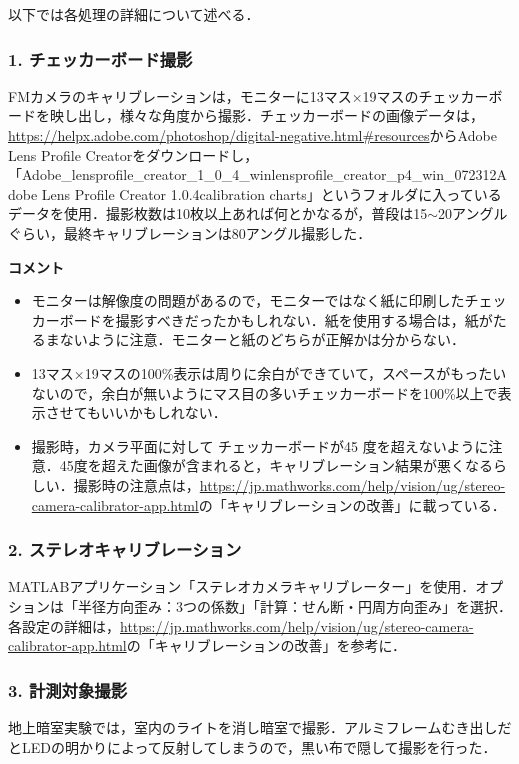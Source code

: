\newpage
以下では各処理の詳細について述べる．

\subsubsection*{1. チェッカーボード撮影}
FMカメラのキャリブレーションは，モニターに13マス×19マスのチェッカーボードを映し出し，様々な角度から撮影．チェッカーボードの画像データは，\url{https://helpx.adobe.com/photoshop/digital-negative.html#resources}からAdobe Lens Profile Creatorをダウンロードし，「\yen Adobe\_lensprofile\_creator\_1\_0\_4\_win\yen  lensprofile\_creator\_p4\_win\_072312\yen Adobe Lens Profile Creator 1.0.4\yen calibration charts」というフォルダに入っているデータを使用．撮影枚数は10枚以上あれば何とかなるが，普段は15$\sim$20アングルぐらい，最終キャリブレーションは80アングル撮影した．

\vspace{2ex}
\textbf{コメント}
\begin{itemize}
	\item モニターは解像度の問題があるので，モニターではなく紙に印刷したチェッカーボードを撮影すべきだったかもしれない．紙を使用する場合は，紙がたるまないように注意．モニターと紙のどちらが正解かは分からない．
	\item 13マス×19マスの100\%表示は周りに余白ができていて，スペースがもったいないので，余白が無いようにマス目の多いチェッカーボードを100\%以上で表示させてもいいかもしれない．
	\item 撮影時，カメラ平面に対して チェッカーボードが45 度を超えないように注意．45度を超えた画像が含まれると，キャリブレーション結果が悪くなるらしい．撮影時の注意点は，\url{https://jp.mathworks.com/help/vision/ug/stereo-camera-calibrator-app.html}の「キャリブレーションの改善」に載っている．
\end{itemize}

\subsubsection*{2. ステレオキャリブレーション}
MATLABアプリケーション「ステレオカメラキャリブレーター」を使用．オプションは「半径方向歪み：3つの係数」「計算：せん断・円周方向歪み」を選択．各設定の詳細は，\url{https://jp.mathworks.com/help/vision/ug/stereo-camera-calibrator-app.html}の「キャリブレーションの改善」を参考に．

\subsubsection*{3. 計測対象撮影}
地上暗室実験では，室内のライトを消し暗室で撮影．アルミフレームむき出しだとLEDの明かりによって反射してしまうので，黒い布で隠して撮影を行った．

